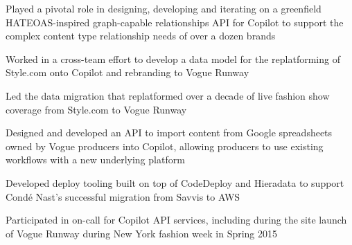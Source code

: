 \begin{job}

  \begin{accomplishments}
    \item Played a pivotal role in designing, developing and iterating on a
    greenfield HATEOAS-inspired graph-capable relationships API for Copilot to
    support the complex content type relationship needs of over a dozen brands
    \item Worked in a cross-team effort to develop a data model for the
    replatforming of Style.com onto Copilot and rebranding to Vogue Runway
    \item Led the data migration that replatformed over a decade of live fashion
    show coverage from Style.com to Vogue Runway
    \item Designed and developed an API to import content from Google spreadsheets
    owned by Vogue producers into Copilot, allowing producers to use existing
    workflows with a new underlying platform
    \item Developed deploy tooling built on top of CodeDeploy and Hieradata to
    support Cond\'{e} Nast's successful migration from Savvis to AWS
    \item Participated in on-call for Copilot API services, including during the
    site launch of Vogue Runway during New York fashion week in Spring 2015
  \end{accomplishments}
\end{job}
